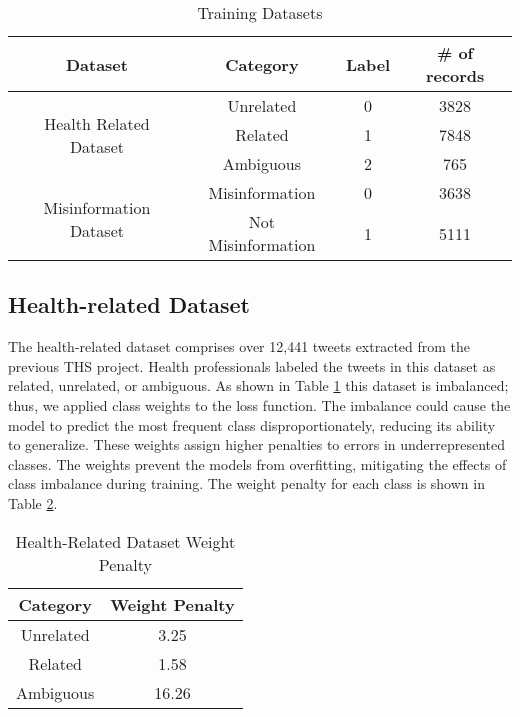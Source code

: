 \begin{table}[H]
	\centering
	\caption{Training Datasets}
	\begin{tabular}{||c | c | c| c||} 
		\hline
		\textbf{Dataset} &
		\textbf{Category} & \textbf{Label}& \textbf{\# of records} \\ [1.5ex] 
		\hline
		\multirow{3}{6.75em}{Health Related Dataset} & Unrelated & 0 & 3828  \\[1ex]
		& Related & 1 & 7848  \\ [1ex]
		& Ambiguous & 2 & 765 \\[1ex]
		\hline
		\multirow{2}{6.75em}{Misinformation Dataset} & Misinformation & 0 & 3638\\ [1ex]
		& Not Misinformation & 1 & 5111  \\[1ex]
		\hline
	\end{tabular}
	\label{table:dataset}
\end{table}


\subsection{Health-related Dataset}
The health-related dataset comprises over 12,441 tweets extracted from the previous THS project.  Health professionals labeled the tweets in this dataset as related, unrelated, or ambiguous. As shown in Table \ref{table:dataset} this dataset is imbalanced; thus, we applied class weights to the loss function. The imbalance could cause the model to predict the most frequent class disproportionately, reducing its ability to generalize. These weights assign higher penalties to errors in underrepresented classes. The weights prevent the models from overfitting, mitigating the effects of class imbalance during training. The weight penalty for each class is shown in Table \ref{table:healthweight}.

\begin{table}[H]
	\centering
	\caption{Health-Related Dataset Weight Penalty}
	\begin{tabular}{||c | c||} 
			\hline
			\textbf{Category} & \textbf{Weight Penalty} \\ [1.5ex] 
			\hline
			Unrelated & 3.25 \\ [1ex]
			\hline
			Related & 1.58 \\[1ex]
			\hline
			Ambiguous & 16.26 \\[1ex]
			\hline
		\end{tabular}
	\label{table:healthweight}
\end{table}



